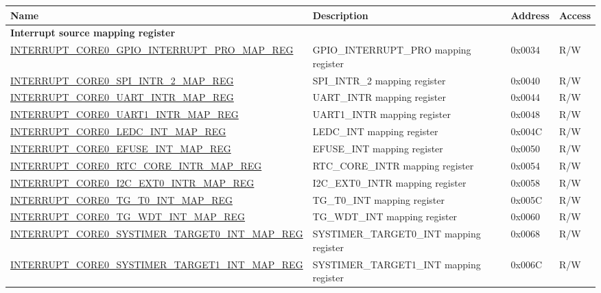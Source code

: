 \begin{longtable}{ | p{10cm} | m{10cm} | m{1.3cm} | m{1.0cm} | }
\hline\rowcolor{lightgray}
Name & Description & Address & Access \\ \hline
\endhead
\multicolumn{4}{|l|}{\textbf{Interrupt source mapping register}} \\ \hline
\hyperref[regdesc:INTERRUPTCORE0GPIOINTERRUPTPROMAPREG]{INTERRUPT\_CORE0\_GPIO\_INTERRUPT\_PRO\_MAP\_REG} & GPIO\_INTERRUPT\_PRO mapping register & 0x0034 & R/W \\ \hline
\hyperref[regdesc:INTERRUPTCORE0SPIINTR2MAPREG]{INTERRUPT\_CORE0\_SPI\_INTR\_2\_MAP\_REG} & SPI\_INTR\_2 mapping register & 0x0040 & R/W \\ \hline
\hyperref[regdesc:INTERRUPTCORE0UARTINTRMAPREG]{INTERRUPT\_CORE0\_UART\_INTR\_MAP\_REG} & UART\_INTR mapping register & 0x0044 & R/W \\ \hline
\hyperref[regdesc:INTERRUPTCORE0UART1INTRMAPREG]{INTERRUPT\_CORE0\_UART1\_INTR\_MAP\_REG} & UART1\_INTR mapping register & 0x0048 & R/W \\ \hline
\hyperref[regdesc:INTERRUPTCORE0LEDCINTMAPREG]{INTERRUPT\_CORE0\_LEDC\_INT\_MAP\_REG} & LEDC\_INT mapping register & 0x004C & R/W \\ \hline
\hyperref[regdesc:INTERRUPTCORE0EFUSEINTMAPREG]{INTERRUPT\_CORE0\_EFUSE\_INT\_MAP\_REG} & EFUSE\_INT mapping register & 0x0050 & R/W \\ \hline
\hyperref[regdesc:INTERRUPTCORE0RTCCOREINTRMAPREG]{INTERRUPT\_CORE0\_RTC\_CORE\_INTR\_MAP\_REG} & RTC\_CORE\_INTR mapping register & 0x0054 & R/W \\ \hline
\hyperref[regdesc:INTERRUPTCORE0I2CEXT0INTRMAPREG]{INTERRUPT\_CORE0\_I2C\_EXT0\_INTR\_MAP\_REG} & I2C\_EXT0\_INTR mapping register & 0x0058 & R/W \\ \hline
\hyperref[regdesc:INTERRUPTCORE0TGT0INTMAPREG]{INTERRUPT\_CORE0\_TG\_T0\_INT\_MAP\_REG} & TG\_T0\_INT mapping register & 0x005C & R/W \\ \hline
\hyperref[regdesc:INTERRUPTCORE0TGWDTINTMAPREG]{INTERRUPT\_CORE0\_TG\_WDT\_INT\_MAP\_REG} & TG\_WDT\_INT mapping register & 0x0060 & R/W \\ \hline
\hyperref[regdesc:INTERRUPTCORE0SYSTIMERTARGET0INTMAPREG]{INTERRUPT\_CORE0\_SYSTIMER\_TARGET0\_INT\_MAP\_REG} & SYSTIMER\_TARGET0\_INT mapping register & 0x0068 & R/W \\ \hline
\hyperref[regdesc:INTERRUPTCORE0SYSTIMERTARGET1INTMAPREG]{INTERRUPT\_CORE0\_SYSTIMER\_TARGET1\_INT\_MAP\_REG} & SYSTIMER\_TARGET1\_INT mapping register & 0x006C & R/W \\ \hline

\end{longtable}
